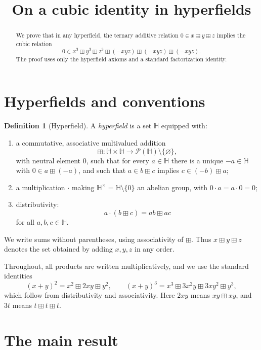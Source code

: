 \documentclass{article}
\title{On a cubic identity in hyperfields}
\author{}
\date{}
\theoremstyle{definition}
\newtheorem{definition}[theorem]{Definition}
\begin{document}
\maketitle

\begin{abstract}
We prove that in any hyperfield, the ternary additive relation
\(0\in x\boxplus y\boxplus z\) implies the cubic relation
\[
0\in x^3\boxplus y^3\boxplus z^3\boxplus(-xyz)\boxplus(-xyz)\boxplus(-xyz).
\]
The proof uses only the hyperfield axioms and a standard factorization identity.
\end{abstract}

\section{Hyperfields and conventions}

\begin{definition}[Hyperfield]
A \emph{hyperfield} is a set \(\mathbb H\) equipped with:
\begin{enumerate}
    \item a commutative, associative multivalued addition
    \[
    \boxplus:\mathbb H\times \mathbb H\to \mathcal P(\mathbb H)\setminus\{\varnothing\},
    \]
    with neutral element \(0\), such that for every \(a\in\mathbb H\) there is a unique
    \(-a\in\mathbb H\) with \(0\in a\boxplus(-a)\), and such that
    \(a\in b\boxplus c\) implies \(c\in(-b)\boxplus a\);
    \item a multiplication \(\cdot\) making \(\mathbb H^\times=\mathbb H\setminus\{0\}\)
    an abelian group, with \(0\cdot a=a\cdot 0=0\);
    \item distributivity:
    \[
    a\cdot(b\boxplus c)=ab\boxplus ac
    \]
    for all \(a,b,c\in\mathbb H\).
\end{enumerate}
We write sums without parentheses, using associativity of \(\boxplus\). Thus
\(x\boxplus y\boxplus z\) denotes the set obtained by adding \(x,y,z\) in any order.
\end{definition}

Throughout, all products are written multiplicatively, and we use the standard
identities
\[
(x+y)^2=x^2\boxplus 2xy\boxplus y^2,\qquad
(x+y)^3=x^3\boxplus 3x^2y\boxplus 3xy^2\boxplus y^3,
\]
which follow from distributivity and associativity. Here \(2xy\) means
\(xy\boxplus xy\), and \(3t\) means \(t\boxplus t\boxplus t\).

\section{The main result}
\end{document}
